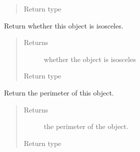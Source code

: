 \documentclass[letterpaper,10pt,english]{sphinxmanual}
\begin{document}
\begin{fulllineitems}
\begin{fulllineitems}
\begin{quote}
\begin{description}
\item[{Return type}] \leavevmode
{}

\end{description}\end{quote}

\end{fulllineitems}


\begin{fulllineitems}
\label{\detokenize{api:trianglelib.shape.Triangle.is_isosceles}}
Return whether this {\hyperref[\detokenize{api:trianglelib.shape.Triangle}]{}} object is isosceles.
\begin{quote}\begin{description}
\item[{Returns}] \leavevmode
whether the {\hyperref[\detokenize{api:trianglelib.shape.Triangle}]{}} object is isosceles

\item[{Return type}] \leavevmode
{}

\end{description}\end{quote}

\end{fulllineitems}


\begin{fulllineitems}
\label{\detokenize{api:trianglelib.shape.Triangle.perimeter}}
Return the perimeter of this {\hyperref[\detokenize{api:trianglelib.shape.Triangle}]{}} object.
\begin{quote}\begin{description}
\item[{Returns}] \leavevmode
the perimeter of the {\hyperref[\detokenize{api:trianglelib.shape.Triangle}]{}} object.

\item[{Return type}] \leavevmode
{}


\end{description}
\end{quote}
\end{fulllineitems}
\end{fulllineitems}
\end{document}

